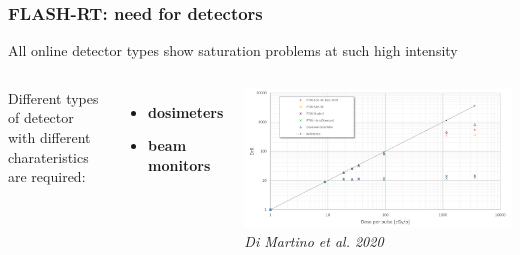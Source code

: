     \begin{frame}
        \frametitle{FLASH-RT: need for detectors}
        All online detector types show saturation problems at such high intensity
        \medskip
        \begin{columns}
            Different types of detector with different charateristics are required: 
                \begin{itemize}
                    \item \textbf{dosimeters} 
                    \item \textbf{beam monitors} 
                \end{itemize}
                \hspace*{-0.6cm}
                \includegraphics[width=1.15\linewidth]{figures/pixel_detectors_usage/saturation_dosimeters.pdf}
                \centering\textit{Di Martino et al. 2020}\\\bigskip
        \end{columns}
    \end{frame}     

